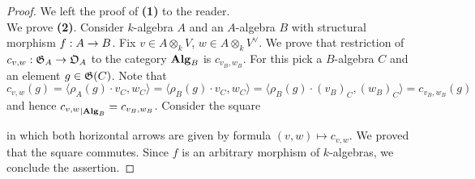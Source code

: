 \begin{proof}
We left the proof of \textbf{(1)} to the reader.\\
We prove \textbf{(2)}. Consider $k$-algebra $A$ and an $A$-algebra $B$ with structural morphism $f:A\rightarrow B$. Fix $v\in A\otimes_kV$, $w\in A\otimes_kV^{\vee}$. We prove that restriction of $c_{v,w}:{\mathfrak G}_A\rightarrow {\mathfrak O}_A$ to the category $\mathbf{Alg}_B$ is $c_{v_B,w_B}$. For this pick a $B$-algebra $C$ and an element $g\in {\mathfrak G}(C)$. Note that
$$c_{v,w}(g)= \langle \rho_A(g)\cdot v_C,w_C \rangle =  \langle \rho_B(g)\cdot v_C,w_C\rangle = \langle \rho_B(g)\cdot (v_B)_C,(w_B)_C\rangle = c_{v_B,w_B}(g)$$
and hence ${c_{v,w}}_{\mid \mathbf{Alg}_B} = c_{v_B,w_B}$. Consider the square
\begin{center}
\end{center}
in which both horizontal arrows are given by formula $(v,w)\mapsto c_{v,w}$. We proved that the square commutes. Since $f$ is an arbitrary morphism of $k$-algebras, we conclude the assertion.
\end{proof}

